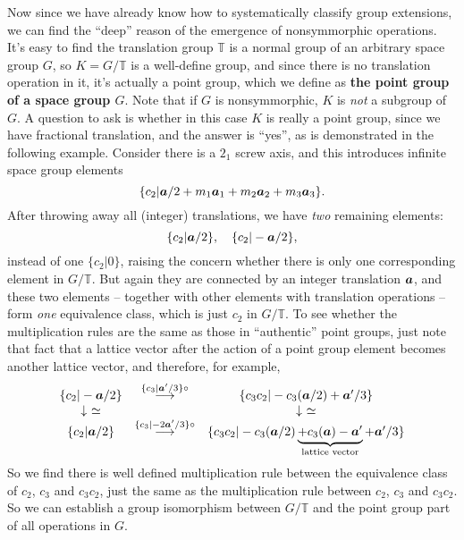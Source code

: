\documentclass[hyperref, a4paper]{article}
\newcommand*{\concept}[1]{{\textbf{#1}}}
\begin{document}
Now since we have already know how to systematically classify group extensions, we can find the ``deep'' reason 
of the emergence of nonsymmorphic operations. It's easy to find the translation group $\mathbb{T}$ is a normal
group of an arbitrary space group $G$, so $K = G / \mathbb{T}$ is a well-define group, and since there is no 
translation operation in it, it's actually a point group, which we define as 
\concept{the point group of a space group $G$}. Note that if $G$ is nonsymmorphic, $K$ is \emph{not} a subgroup of $G$.
A question to ask is whether in this case $K$ is really a point group, since we have fractional 
translation, and the answer is ``yes'', as is demonstrated in the following example. 
Consider there is a $2_1$ screw axis, and this introduces infinite space group elements 
\[
    \{ c_2 | \vb*{a} / 2 + m_1 \vb*{a}_1 + m_2 \vb*{a}_2 + m_3 \vb*{a}_3 \}.
\]
After throwing away all (integer) translations, we have \emph{two} remaining elements:
\[
    \{ c_2 | \vb*{a} / 2 \}, \quad \{ c_2 | - \vb*{a} / 2 \},
\]
instead of one $\{c_2 | 0\}$, raising the concern whether there is only one corresponding element in $G / \mathbb{T}$.
But again they are connected by an integer translation $\vb*{a}$, and these two elements -- together with  
other elements with translation operations -- form \emph{one} equivalence class, which is just $c_2$ in $G / \mathbb{T}$. 
To see whether the multiplication rules are the same as those in ``authentic'' point groups, just note that fact 
that a lattice vector after the action of a point group element becomes another lattice vector, and 
therefore, for example, 
\[
    \begin{matrix}
        \{ c_2 | - \vb*{a} / 2 \} & \stackrel{ \{ c_3 | \vb*{a}' / 3 \} \circ }{\longrightarrow} & \{ c_3 c_2 | - c_3(\vb*{a} / 2) + \vb*{a}' / 3 \} \\
        \downarrow \  \simeq &  & \downarrow \ \simeq \\
        \{ c_2 | \vb*{a} / 2 \} & \stackrel{\{ c_3 | - 2 \vb*{a}' / 3 \} \circ}{\longrightarrow} & \{ c_3 c_2 | - c_3(\vb*{a} / 2) \underbrace{+ c_3(\vb*{a}) - \vb*{a}'}_{\text{lattice vector}} + \vb*{a}' / 3 \}
    \end{matrix}
\]
So we find there is well defined multiplication rule between the equivalence class of $c_2$, $c_3$ and $c_3 c_2$,
just the same as the multiplication rule between $c_2$, $c_3$ and $c_3 c_2$. So we can establish a 
group isomorphism between $G / \mathbb{T}$ and the point group part of all operations in $G$. 
\end{document}
